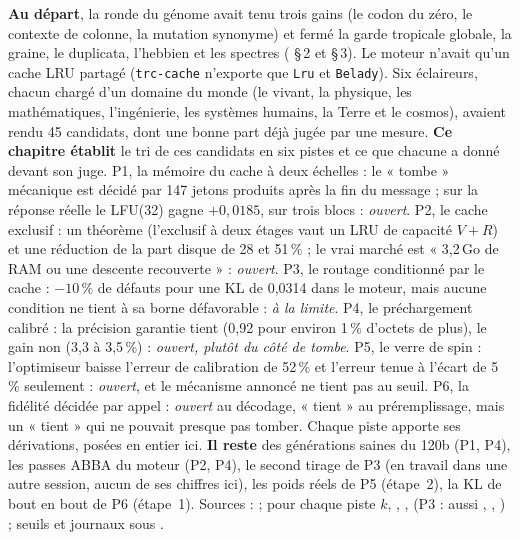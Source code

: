 \begin{origine}
\textbf{Au départ}, la ronde du génome avait tenu trois gains (le codon du zéro, le contexte de colonne, la mutation synonyme) et fermé la garde tropicale globale, la graine, le duplicata, l'hebbien et les spectres ( §\,2 et §\,3). Le moteur n'avait qu'un cache LRU partagé (\texttt{trc-cache} n'exporte que \texttt{Lru} et \texttt{Belady}). Six éclaireurs, chacun chargé d'un domaine du monde (le vivant, la physique, les mathématiques, l'ingénierie, les systèmes humains, la Terre et le cosmos), avaient rendu 45 candidats, dont une bonne part déjà jugée par une mesure.
\textbf{Ce chapitre établit} le tri de ces candidats en six pistes et ce que chacune a donné devant son juge. P1, la mémoire du cache à deux échelles : le « tombe » mécanique est décidé par 147 jetons produits après la fin du message ; sur la réponse réelle le LFU(32) gagne $+0{,}0185$, sur trois blocs : \emph{ouvert}. P2, le cache exclusif : un théorème (l'exclusif à deux étages vaut un LRU de capacité $V+R$) et une réduction de la part disque de 28 et 51\,\% ; le vrai marché est « 3,2\,Go de RAM ou une descente recouverte » : \emph{ouvert}. P3, le routage conditionné par le cache : $-10\,\%$ de défauts pour une KL de 0,0314 dans le moteur, mais aucune condition ne tient à sa borne défavorable : \emph{à la limite}. P4, le préchargement calibré : la précision garantie tient (0,92 pour environ 1\,\% d'octets de plus), le gain non (3,3 à 3,5\,\%) : \emph{ouvert, plutôt du côté de tombe}. P5, le verre de spin : l'optimiseur baisse l'erreur de calibration de 52\,\% et l'erreur tenue à l'écart de 5\,\% seulement : \emph{ouvert}, et le mécanisme annoncé ne tient pas au seuil. P6, la fidélité décidée par appel : \emph{ouvert} au décodage, « tient » au préremplissage, mais un « tient » qui ne pouvait presque pas tomber. Chaque piste apporte ses dérivations, posées en entier ici.
\textbf{Il reste} des générations saines du 120b (P1, P4), les passes ABBA du moteur (P2, P4), le second tirage de P3 (en travail dans une autre session, aucun de ses chiffres ici), les poids réels de P5 (étape~2), la KL de bout en bout de P6 (étape~1).
Sources :  ; pour chaque piste $k$, , ,  (P3 : aussi , , ) ; seuils et journaux sous .
\end{origine}

